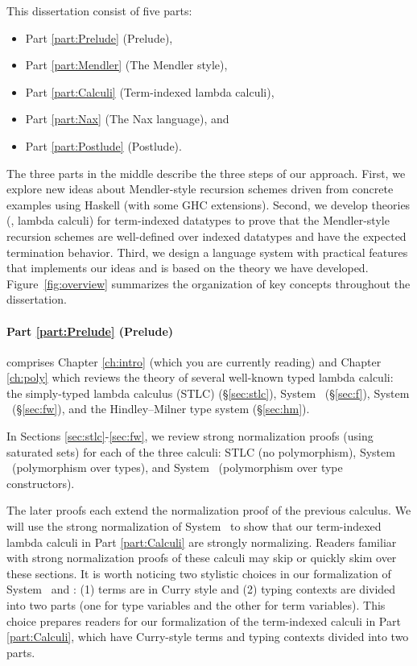 This dissertation consist of five parts:
\begin{itemize}
\item Part \ref{part:Prelude} (Prelude),
\item Part \ref{part:Mendler} (The Mendler style),
\item Part \ref{part:Calculi} (Term-indexed lambda calculi),
\item Part \ref{part:Nax} (The Nax language), and
\item Part \ref{part:Postlude} (Postlude).
\end{itemize}
The three parts in the middle describe the three steps of our approach. 
First, we explore new ideas about
Mendler-style recursion schemes driven from concrete examples
using Haskell (with some GHC extensions). Second, we develop
theories (\ie, lambda calculi) for term-indexed datatypes to prove that
the Mendler-style recursion schemes are well-defined over indexed datatypes
and have the expected termination behavior. Third, we design a language system
with practical features that implements our ideas and is based on the
theory we have developed. Figure~\ref{fig:overview} summarizes
the organization of key concepts throughout the dissertation.

\paragraph{Part \ref{part:Prelude} (Prelude)}\hspace{-1em} 
comprises Chapter \ref{ch:intro} (which you are currently reading)
and Chapter \ref{ch:poly} which 
reviews the theory of several well-known typed lambda calculi:
the simply-typed lambda calculus (STLC) (\S\ref{sec:stlc}),
System \F\ (\S\ref{sec:f}),
System \Fw\ (\S\ref{sec:fw}), and
the Hindley--Milner type system (\S\ref{sec:hm}).

In Sections \ref{sec:stlc}-\ref{sec:fw}, we review strong normalization proofs
(using saturated sets) for each of the three calculi:
STLC (no polymorphism), System \F\ (polymorphism over types), and
System \Fw\ (polymorphism over type constructors).

The later proofs each extend the normalization proof of the previous calculus.
We will use the strong normalization of System \Fw\ to show that
our term-indexed lambda calculi in Part \ref{part:Calculi} are
strongly normalizing. Readers familiar with strong normalization proofs
of these calculi may skip or quickly skim over these sections.
It is worth noticing two stylistic choices in our formalization of
System \F\ and \Fw: (1) terms are in Curry style and
(2) typing contexts are divided into two parts
    (one for type variables and the other for term variables).
This choice prepares readers for our formalization of the term-indexed calculi
in Part \ref{part:Calculi}, which have Curry-style terms and
typing contexts divided into two parts.

